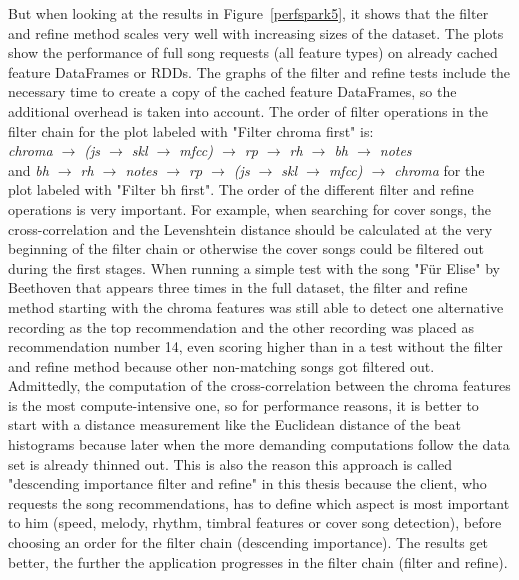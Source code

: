 \noindent But when looking at the results in Figure~\ref{perfspark5}, it shows that the filter and refine method scales very well with increasing sizes of the dataset. The plots show the performance of full song requests (all feature types) on already cached feature DataFrames or RDDs. The graphs of the filter and refine tests include the necessary time to create a copy of the cached feature DataFrames, so the additional overhead is taken into account. 
\noindent The order of filter operations in the filter chain for the plot labeled with "Filter chroma first" is:\\
\textit{chroma $\rightarrow$ (js  $\rightarrow$ skl  $\rightarrow$ mfcc) $\rightarrow$ rp  $\rightarrow$ rh  $\rightarrow$ bh  $\rightarrow$ notes}\\ and 
\textit{bh $\rightarrow$ rh $\rightarrow$ notes $\rightarrow$ rp $\rightarrow$ (js  $\rightarrow$ skl  $\rightarrow$ mfcc) $\rightarrow$ chroma} for the plot labeled with "Filter bh first".
\noindent The order of the different filter and refine operations is very important. For example, when searching for cover songs, the cross-correlation and the Levenshtein distance should be calculated at the very beginning of the filter chain or otherwise the cover songs could be filtered out during the first stages. When running a simple test with the song "Für Elise" by Beethoven that appears three times in the full dataset, the filter and refine method starting with the chroma features was still able to detect one alternative recording as the top recommendation and the other recording was placed as recommendation number 14, even scoring higher than in a test without the filter and refine method because other non-matching songs got filtered out.\\
Admittedly, the computation of the cross-correlation between the chroma features is the most compute-intensive one, so for performance reasons, it is better to start with a distance measurement like the Euclidean distance of the beat histograms because later when the more demanding computations follow the data set is already thinned out. 
This is also the reason this approach is called "descending importance filter and refine" in this thesis because the client, who requests the song recommendations, has to define which aspect is most important to him (speed, melody, rhythm, timbral features or cover song detection), before choosing an order for the filter chain (descending importance). The results get better, the further the application progresses in the filter chain (filter and refine).

